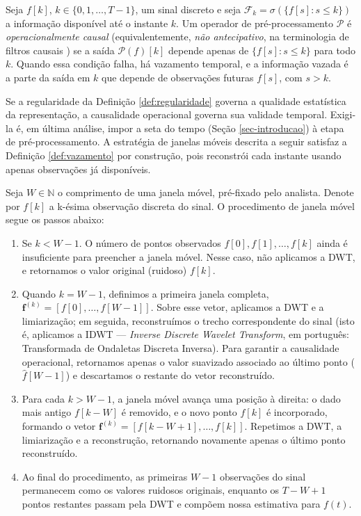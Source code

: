 \begin{definition}\label{def:vazamento}
    Seja \(f[k]\), \(k \in \{0, 1, \dots, T-1\}\), um sinal discreto e seja \(\mathcal{F}_k = \sigma\!\left(\{f[s] : s \leq k\}\right)\) a informação disponível até o instante \(k\).
    Um operador de pré-processamento \(\mathcal{P}\) é \emph{operacionalmente causal} (equivalentemente, \emph{não antecipativo}, na terminologia de filtros causais \cite{oppenheim_discrete-time_2010}) se a saída \(\mathcal{P}(f)[k]\) depende apenas de \(\{f[s] : s \leq k\}\) para todo \(k\).
    Quando essa condição falha, há vazamento temporal, e a informação vazada é a parte da saída em \(k\) que depende de observações futuras \(f[s]\), com \(s > k\).
\end{definition}

Se a regularidade da Definição \ref{def:regularidade} governa a qualidade estatística da representação, a causalidade operacional governa sua validade temporal.
Exigi-la é, em última análise, impor a seta do tempo (Seção \ref{sec-introducao}) à etapa de pré-processamento.
A estratégia de janelas móveis descrita a seguir satisfaz a Definição \ref{def:vazamento} por construção, pois reconstrói cada instante usando apenas observações já disponíveis.

Seja \(W \in \mathbb{N}\) o comprimento de uma janela móvel, pré-fixado pelo analista. Denote por \(f[k]\) a k-ésima observação discreta do sinal. O procedimento de janela móvel segue os passos abaixo:

\begin{enumerate}
    \item Se \(k < W - 1\). O número de pontos observados \(f[0], f[1], \dots, f[k]\) ainda é insuficiente para preencher a janela móvel. Nesse caso, não aplicamos a DWT, e retornamos o valor original (ruidoso) \(f[k]\).

    \item Quando \(k = W - 1\), definimos a primeira janela completa, \(\mathbf{f}^{(k)} = [f[0], \dots, f[W-1]]\). Sobre esse vetor, aplicamos a DWT e a limiarização; em seguida, reconstruímos o trecho correspondente do sinal (isto é, aplicamos a IDWT --- \emph{Inverse Discrete Wavelet Transform}, em português: Transformada de Ondaletas Discreta Inversa). Para garantir a causalidade operacional, retornamos apenas o valor suavizado associado ao último ponto (\(\hat{f}[W-1]\)) e descartamos o restante do vetor reconstruído.

    \item Para cada \(k > W - 1\), a janela móvel avança uma posição à direita: o dado mais antigo \(f[k - W]\) é removido, e o novo ponto \(f[k]\) é incorporado, formando o vetor \(\mathbf{f}^{(k)} = [f[k - W + 1], \dots, f[k]]\). Repetimos a DWT, a limiarização e a reconstrução, retornando novamente apenas o último ponto reconstruído.

    \item Ao final do procedimento, as primeiras \(W - 1\) observações do sinal permanecem como os valores ruidosos originais, enquanto os \(T - W + 1\) pontos restantes passam pela DWT e compõem nossa estimativa para \(f(t)\).
\end{enumerate}


